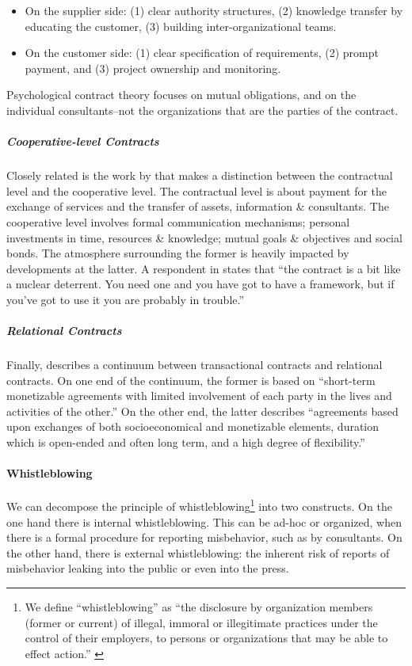 \documentclass[12pt]{article}
\providecommand{\tightlist}{%
  \setlength{\itemsep}{0pt}\setlength{\parskip}{0pt}}
\begin{document}
\begin{itemize}
\tightlist
\item
  On the supplier side: (1) clear authority structures, (2) knowledge
  transfer by educating the customer, (3) building inter-organizational
  teams.
\item
  On the customer side: (1) clear specification of requirements, (2)
  prompt payment, and (3) project ownership and monitoring.
\end{itemize}

Psychological contract theory focuses on mutual obligations, and on the
individual consultants--not the organizations that are the parties of
the contract.

\subparagraph{Cooperative-level
Contracts}\label{cooperative-level-contracts}

Closely related is the work by \citet[9-13]{willcockskern} that makes a
distinction between the contractual level and the cooperative level. The
contractual level is about payment for the exchange of services and the
transfer of assets, information \& consultants. The cooperative level
involves formal communication mechanisms; personal investments in time,
resources \& knowledge; mutual goals \& objectives and social bonds. The
atmosphere surrounding the former is heavily impacted by developments at
the latter. A respondent in \citet[9]{willcockskern} states that ``the
contract is a bit like a nuclear deterrent. You need one and you have
got to have a framework, but if you've got to use it you are probably in
trouble.''

\subparagraph{Relational Contracts}\label{relational-contracts}

Finally, \citet[10-12]{rousseau1993} describes a continuum between
transactional contracts and relational contracts. On one end of the
continuum, the former is based on ``short-term monetizable agreements
with limited involvement of each party in the lives and activities of
the other.'' On the other end, the latter describes ``agreements based
upon exchanges of both socioeconomical and monetizable elements,
duration which is open-ended and often long term, and a high degree of
flexibility.''

\paragraph{Whistleblowing}\label{whistleblowing}

We can decompose the principle of whistleblowing\footnote{We define
  ``whistleblowing'' as ``the disclosure by organization members (former
  or current) of illegal, immoral or illegitimate practices under the
  control of their employers, to persons or organizations that may be
  able to effect action.'' \citep[ 4]{near1985}} into two constructs. On
the one hand there is internal whistleblowing. This can be ad-hoc or
organized, when there is a formal procedure for reporting misbehavior,
such as by consultants. On the other hand, there is external
whistleblowing: the inherent risk of reports of misbehavior leaking into
the public or even into the press.
\end{document}
